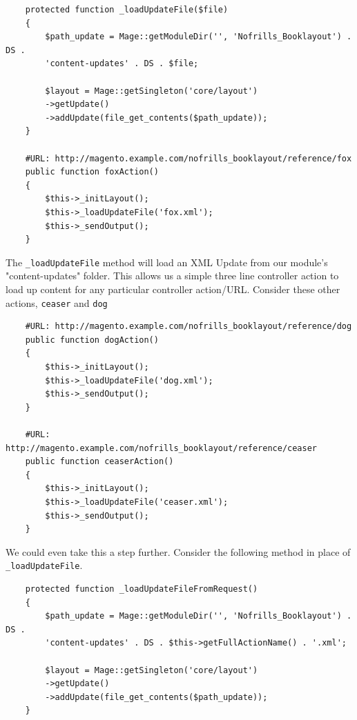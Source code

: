 \documentclass[oneside]{book}
\begin{document}
\begin{lstlisting}
    protected function _loadUpdateFile($file)
    {
        $path_update = Mage::getModuleDir('', 'Nofrills_Booklayout') . DS . 
        'content-updates' . DS . $file;         

        $layout = Mage::getSingleton('core/layout')
        ->getUpdate()
        ->addUpdate(file_get_contents($path_update));                   
    }

    #URL: http://magento.example.com/nofrills_booklayout/reference/fox
    public function foxAction()
    {
        $this->_initLayout();
        $this->_loadUpdateFile('fox.xml');
        $this->_sendOutput();
    }

\end{lstlisting}


The \footnotesize\texttt{\_loadUpdateFile} \normalsize  method will load an XML Update from our module's "content-updates" folder.  This allows us a simple three line controller action to load up content for any particular controller action/URL.  Consider these other actions, \footnotesize\texttt{ceaser} \normalsize  and \footnotesize\texttt{dog} \normalsize 

\begin{lstlisting}
    #URL: http://magento.example.com/nofrills_booklayout/reference/dog
    public function dogAction()
    {
        $this->_initLayout();       
        $this->_loadUpdateFile('dog.xml');
        $this->_sendOutput();
    }

    #URL: http://magento.example.com/nofrills_booklayout/reference/ceaser
    public function ceaserAction()
    {   
        $this->_initLayout();
        $this->_loadUpdateFile('ceaser.xml');
        $this->_sendOutput();
    }

\end{lstlisting}


We could even take this a step further.  Consider the following method in place of \footnotesize\texttt{\_loadUpdateFile}\normalsize.

\begin{lstlisting}
    protected function _loadUpdateFileFromRequest()
    {       
        $path_update = Mage::getModuleDir('', 'Nofrills_Booklayout') . DS . 
        'content-updates' . DS . $this->getFullActionName() . '.xml';       

        $layout = Mage::getSingleton('core/layout')
        ->getUpdate()
        ->addUpdate(file_get_contents($path_update));               
    }

\end{lstlisting}
\end{document}
